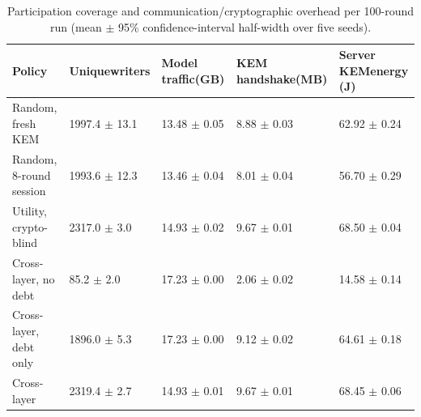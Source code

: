 \begin{table}[!ht]
\caption{Participation coverage and communication/cryptographic overhead per 100-round run (mean $\pm$ 95\% confidence-interval half-width over five seeds).}
\label{tab:communication-overhead}
\centering
\setlength{\tabcolsep}{2pt}
\begin{tabular}{|p{}|p{}|p{}|p{}|p{}|}
\hline
Policy & Unique\newline{}writers & Model traffic\newline{}(GB) & KEM handshake\newline{}(MB) & Server KEM\newline{}energy (J) \\
\hline
Random, fresh KEM & 1997.4 $\pm$ 13.1 & 13.48 $\pm$ 0.05 & 8.88 $\pm$ 0.03 & 62.92 $\pm$ 0.24 \\
\hline
Random, 8-round session & 1993.6 $\pm$ 12.3 & 13.46 $\pm$ 0.04 & 8.01 $\pm$ 0.04 & 56.70 $\pm$ 0.29 \\
\hline
Utility, crypto-blind & 2317.0 $\pm$ 3.0 & 14.93 $\pm$ 0.02 & 9.67 $\pm$ 0.01 & 68.50 $\pm$ 0.04 \\
\hline
Cross-layer, no debt & 85.2 $\pm$ 2.0 & 17.23 $\pm$ 0.00 & 2.06 $\pm$ 0.02 & 14.58 $\pm$ 0.14 \\
\hline
Cross-layer, debt only & 1896.0 $\pm$ 5.3 & 17.23 $\pm$ 0.00 & 9.12 $\pm$ 0.02 & 64.61 $\pm$ 0.18 \\
\hline
Cross-layer & 2319.4 $\pm$ 2.7 & 14.93 $\pm$ 0.01 & 9.67 $\pm$ 0.01 & 68.45 $\pm$ 0.06 \\
\hline
\end{tabular}
\end{table}
